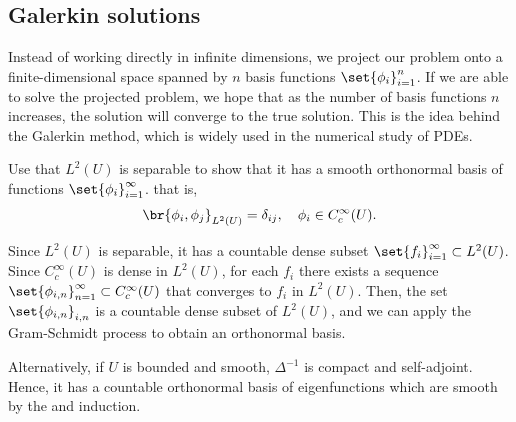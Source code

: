 \documentclass[
    a4paper,
    DIV=14,
    abstract=true,
    numbers=noenddot
]{scrartcl}
\begin{document}
\subsection{Galerkin solutions}
Instead of working directly in infinite dimensions, we project our problem onto a finite-dimensional space spanned by $n$ basis functions $\set{\phi_i}_{i=1}^n$. If we are able to solve the projected problem, we hope that as the number of basis functions $n$ increases, the solution will converge to the true solution. This is the idea behind the Galerkin method, which is widely used in the numerical study of PDEs.
\begin{exercise}
Use that $L^2(U)$ is separable to show that it has a smooth orthonormal basis of functions $\set{\phi_i}_{i=1}^\infty$. that is, 
\begin{align*}
  \br{\phi_i, \phi_j}_{L^2(U)} = \delta_{ij}, \quad \phi_i \in C^\infty_c(U).
\end{align*} 
\end{exercise}
\begin{hint}
Since $L^2(U)$ is separable, it has a countable dense subset $\set{f_i}_{i=1}^\infty \subset L^2(U)$. Since $C_c^\infty(U)$ is dense in $L^2(U)$, for each $f_i$ there exists a sequence $\set{\phi_{i,n}}_{n=1}^\infty \subset C_c^\infty(U)$ that converges to $f_i$ in $L^2(U)$. Then, the set $\set{\phi_{i,n}}_{i,n}$ is a countable dense subset of $L^2(U)$, and we can apply the Gram-Schmidt process to obtain an orthonormal basis. 

Alternatively, if $U$ is bounded and smooth, $\Delta ^{-1}$ is compact and self-adjoint. Hence, it has a countable orthonormal basis of eigenfunctions which are smooth by the  and induction.  
\end{hint}
\end{document}
